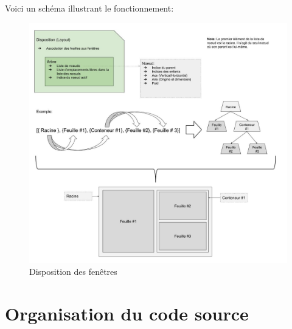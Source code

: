 \documentclass[titlepage]{article}
\begin{document}
Voici un schéma illustrant le fonctionnement:

\begin{figure}[H]
	\centering
	\includegraphics[width=\textwidth]{arbre_de_disposition.jpg}
	\caption{Disposition des fenêtres}
\end{figure}

\section{Organisation du code source}
\end{document}
